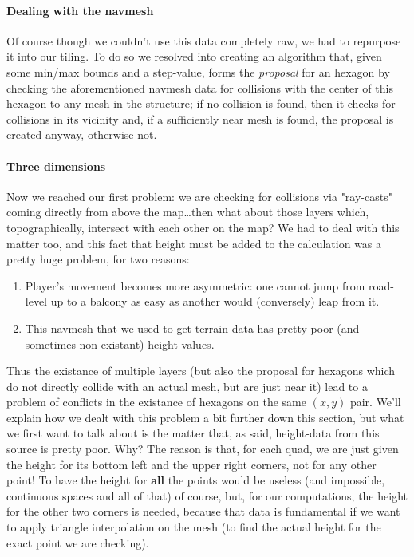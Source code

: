 \documentclass[9pt, a4paper]{IEEEtran}
\begin{document}
    \paragraph*{Dealing with the navmesh} Of course though we couldn't use this data completely raw, we had to repurpose it into our tiling. To do so we resolved into creating an algorithm that, given some min/max bounds and a step-value, forms the \emph{proposal} for an hexagon by checking the aforementioned navmesh data for collisions with the center of this hexagon to any mesh in the structure; if no collision is found, then it checks for collisions in its vicinity and, if a sufficiently near mesh is found, the proposal is created anyway, otherwise not.

    \paragraph*{Three dimensions}
    Now we reached our first problem: we are checking for collisions via "ray-casts" coming directly from above the map\dots then what about those layers which, topographically, intersect with each other on the map? We had to deal with this matter too, and this fact that height must be added to the calculation was a pretty huge problem, for two reasons:

    \begin{enumerate}
        \item Player's movement becomes more asymmetric: one cannot jump from road-level up to a balcony as easy as another would (conversely) leap from it.
        \item This navmesh that we used to get terrain data has pretty poor (and sometimes non-existant) height values.
    \end{enumerate}

    Thus the existance of multiple layers (but also the proposal for hexagons which do not directly collide with an actual mesh, but are just near it) lead to a problem of conflicts in the existance of hexagons on the same $(x,y)$ pair. We'll explain how we dealt with this problem a bit further down this section, but what we first want to talk about is the matter that, as said, height-data from this source is pretty poor. Why? The reason is that, for each quad, we are just given the height for its bottom left and the upper right corners, not for any other point! To have the height for \textbf{all} the points would be useless (and impossible, continuous spaces and all of that) of course, but, for our computations, the height for the other two corners is needed, because that data is fundamental if we want to apply triangle interpolation on the mesh (to find the actual height for the exact point we are checking).
    
\end{document}
